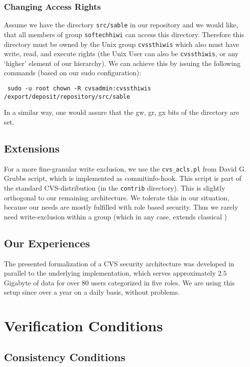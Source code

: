 \subsection{Changing Access Rights}
Assume we have the directory \texttt{src/sable} in our repository and we would like, that all members of group \texttt{softechhiwi} can access this directory. Therefore this directory must be
owned by the Unix group \texttt{cvssthiwis} which also must have write, read, and execute rights (the Unix User can also be \texttt{cvssthiwis}, or any `higher' element of our hierarchy). 
We can achieve this by issuing the following commands (based on our sudo configuration):
\begin{verbatim}
 sudo -u root chown -R cvsadmin:cvssthiwis /export/deposit/repository/src/sable
\end{verbatim}
In a similar way, one would assure that the \textsf{gw, gr, gx} bits of the directory 
are set.
\section{Extensions}
For a more fine-granular write exclusion, we use the \texttt{cvs\_acls.pl} from David G. Grubbs
script, which is implemented as commitinfo-hook. This script is part of the standard 
CVS-distribution (in the \texttt{contrib} directory). 
This is slightly orthogonal to our remaining architecture. We tolerate this in our situation,
because our needs are mostly fulfilled with role based security. Thus we rarely need 
write-exclusion within a group (which in any case, extends classical \rbac)

\section{Our Experiences}
The presented formalization of a CVS security architecture
was developed in parallel to the underlying implementation, which serves
approximately  $2.5$ Gigabyte of data for over $80$ users categorized in 
five roles. We are using this setup since over a year on a daily basis, without 
problems. 

\chapter{Verification Conditions}\label{cha:verif-cond}
\section{Consistency Conditions}
